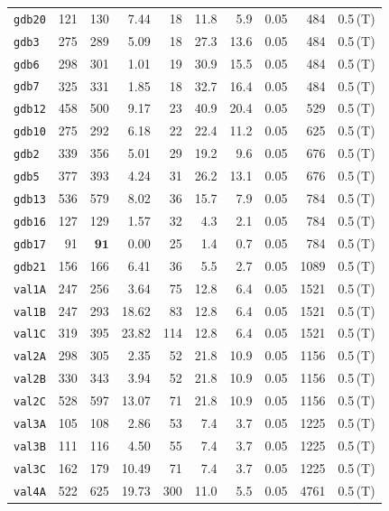 \begin{longtable}{lrrrrrrrrl}
\texttt{gdb20} & 121 & 130 & 7.44 & 18 & 11.8 & 5.9 & 0.05 & 484 & 0.5\,(T) \\
\texttt{gdb3} & 275 & 289 & 5.09 & 18 & 27.3 & 13.6 & 0.05 & 484 & 0.5\,(T) \\
\texttt{gdb6} & 298 & 301 & 1.01 & 19 & 30.9 & 15.5 & 0.05 & 484 & 0.5\,(T) \\
\texttt{gdb7} & 325 & 331 & 1.85 & 18 & 32.7 & 16.4 & 0.05 & 484 & 0.5\,(T) \\
\texttt{gdb12} & 458 & 500 & 9.17 & 23 & 40.9 & 20.4 & 0.05 & 529 & 0.5\,(T) \\
\texttt{gdb10} & 275 & 292 & 6.18 & 22 & 22.4 & 11.2 & 0.05 & 625 & 0.5\,(T) \\
\texttt{gdb2} & 339 & 356 & 5.01 & 29 & 19.2 & 9.6 & 0.05 & 676 & 0.5\,(T) \\
\texttt{gdb5} & 377 & 393 & 4.24 & 31 & 26.2 & 13.1 & 0.05 & 676 & 0.5\,(T) \\
\texttt{gdb13} & 536 & 579 & 8.02 & 36 & 15.7 & 7.9 & 0.05 & 784 & 0.5\,(T) \\
\texttt{gdb16} & 127 & 129 & 1.57 & 32 & 4.3 & 2.1 & 0.05 & 784 & 0.5\,(T) \\
\texttt{gdb17} & 91 & $\mathbf{91}$ & 0.00 & 25 & 1.4 & 0.7 & 0.05 & 784 & 0.5\,(T) \\
\texttt{gdb21} & 156 & 166 & 6.41 & 36 & 5.5 & 2.7 & 0.05 & 1089 & 0.5\,(T) \\
\texttt{val1A} & 247 & 256 & 3.64 & 75 & 12.8 & 6.4 & 0.05 & 1521 & 0.5\,(T) \\
\texttt{val1B} & 247 & 293 & 18.62 & 83 & 12.8 & 6.4 & 0.05 & 1521 & 0.5\,(T) \\
\texttt{val1C} & 319 & 395 & 23.82 & 114 & 12.8 & 6.4 & 0.05 & 1521 & 0.5\,(T) \\
\texttt{val2A} & 298 & 305 & 2.35 & 52 & 21.8 & 10.9 & 0.05 & 1156 & 0.5\,(T) \\
\texttt{val2B} & 330 & 343 & 3.94 & 52 & 21.8 & 10.9 & 0.05 & 1156 & 0.5\,(T) \\
\texttt{val2C} & 528 & 597 & 13.07 & 71 & 21.8 & 10.9 & 0.05 & 1156 & 0.5\,(T) \\
\texttt{val3A} & 105 & 108 & 2.86 & 53 & 7.4 & 3.7 & 0.05 & 1225 & 0.5\,(T) \\
\texttt{val3B} & 111 & 116 & 4.50 & 55 & 7.4 & 3.7 & 0.05 & 1225 & 0.5\,(T) \\
\texttt{val3C} & 162 & 179 & 10.49 & 71 & 7.4 & 3.7 & 0.05 & 1225 & 0.5\,(T) \\
\texttt{val4A} & 522 & 625 & 19.73 & 300 & 11.0 & 5.5 & 0.05 & 4761 & 0.5\,(T) \\

\end{longtable}

